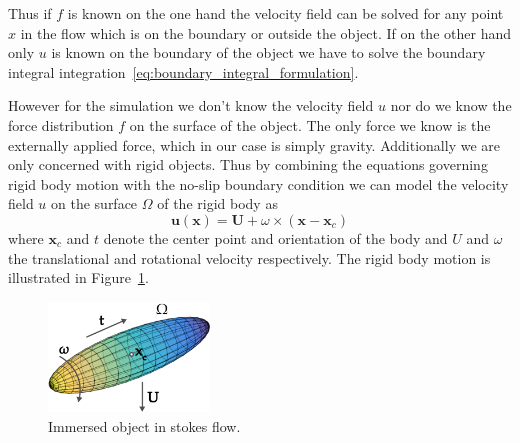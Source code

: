\documentclass[a4paper,11pt]{kth-mag}
\begin{document}
Thus if $f$ is known on the one hand the velocity field can be solved for any point $x$ in the flow which is on the boundary or outside the object. If on the other hand only $u$ is known on the boundary of the object we have to solve the boundary integral integration~\eqref{eq:boundary_integral_formulation}.

However for the simulation we don't know the velocity field $u$ nor do we know the force distribution $f$ on the surface of the object. The only force we know is the externally applied force, which in our case is simply gravity. Additionally we are only concerned with rigid objects. Thus by combining the equations governing rigid body motion with the no-slip boundary condition we can model the velocity field $u$ on the surface $\Omega$ of the rigid body as
\begin{equation}
  \label{eq:rigid_body_motion}
  \mathbf{u}(\mathbf{x}) = \mathbf{U} + \omega \times (\mathbf{x} - \mathbf{x}_c)
\end{equation}
where $\mathbf{x}_c$ and $t$ denote the center point and orientation of the body and $U$ and $\omega$ the translational and rotational velocity respectively. The rigid body motion is illustrated in Figure~\ref{fig:immersed_rigid}.

\begin{figure}[!htbp]
  \centering
  \includegraphics[width=0.3819660112501450000000\textwidth]{img/immersed_rigid.pdf}
  \caption{Immersed object in stokes flow.}
  \label{fig:immersed_rigid}
\end{figure}
\end{document}
